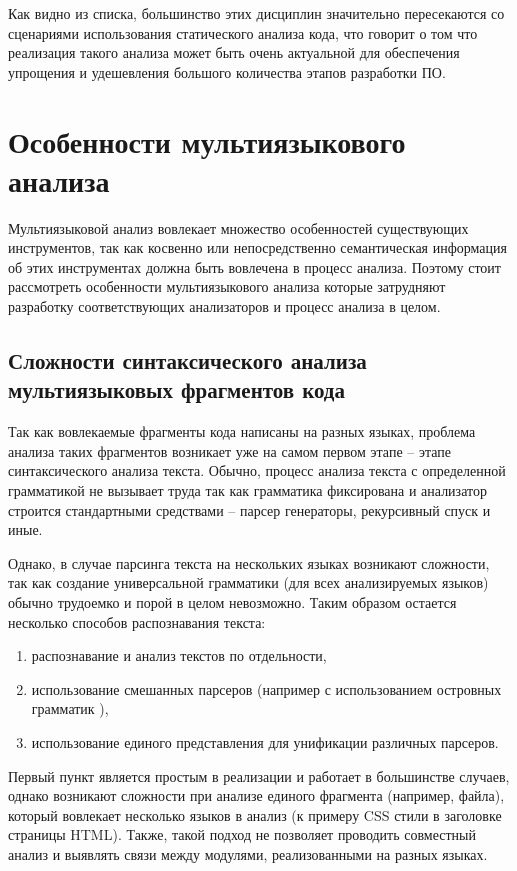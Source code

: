 Как видно из списка, большинство этих дисциплин значительно пересекаются со сценариями использования
статического анализа кода, что говорит о том что реализация такого анализа может быть очень актуальной
для обеспечения упрощения и удешевления большого количества этапов разработки ПО.

\section{Особенности мультиязыкового анализа} \label{ssec:num1}

Мультиязыковой анализ вовлекает множество особенностей существующих инструментов, так как косвенно или
непосредственно семантическая информация об этих инструментах должна быть вовлечена в процесс анализа.
Поэтому стоит рассмотреть особенности мультиязыкового анализа которые затрудняют разработку соответствующих
анализаторов и процесс анализа в целом.

\subsection{Сложности синтаксического анализа мультиязыковых фрагментов кода} \label{ssec:parsing-problem}

Так как вовлекаемые фрагменты кода написаны на разных языках, проблема анализа таких фрагментов
возникает уже на самом первом этапе -- этапе синтаксического анализа текста. Обычно, процесс анализа
текста с определенной грамматикой не вызывает труда так как грамматика фиксирована и анализатор строится
стандартными средствами -- парсер генераторы, рекурсивный спуск и иные. 

Однако, в случае парсинга текста на нескольких языках возникают сложности, так как создание универсальной
грамматики (для всех анализируемых языков) обычно трудоемко и порой в целом невозможно. Таким образом остается
несколько способов распознавания текста:
\begin{enumerate}[1)]
    \item распознавание и анализ текстов по отдельности,
    \item использование смешанных парсеров (например с использованием островных грамматик \cite{island-grammars}),
    \item использование единого представления для унификации различных парсеров.
\end{enumerate}

Первый пункт является простым в реализации и работает в большинстве случаев, однако
возникают сложности при анализе единого фрагмента (например, файла), который вовлекает несколько
языков в анализ (к примеру CSS стили в заголовке страницы HTML). Также, такой подход не позволяет
проводить совместный анализ и выявлять связи между модулями, реализованными на разных языках.

